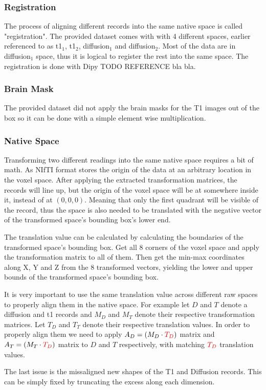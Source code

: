 \subsubsection{Registration}
The process of aligning different records into the same native space is called "registration". The provided dataset comes with with 4 different spaces, earlier referenced to as t1$_1$, t1$_2$, diffusion$_1$ and diffusion$_2$. Most of the data are in diffusion$_1$ space, thus it is logical to register the rest into the same space. The registration is done with Dipy TODO REFERENCE bla bla.

\subsubsection{Brain Mask}
The provided dataset did not apply the brain masks for the T1 images out of the box so it can be done with a simple element wise multiplication.

\subsubsection{Native Space}
Transforming two different readings into the same native space requires a bit of math. As \ac{NIfTI} format stores the origin of the data at an arbitrary location in the voxel space. After applying the extracted transformation matrices, the records will line up, but the origin of the voxel space will be at somewhere inside it, instead of at $(0,0,0)$. Meaning that only the first quadrant will be visible of the record, thus the space is also needed to be translated with the negative vector of the transformed space's bounding box's lower end.\par
The translation value can be calculated by calculating the boundaries of the transformed space's bounding box. Get all 8 corners of the voxel space and apply the transformation matrix to all of them. Then get the min-max coordinates along X, Y and Z from the 8 transformed vectors, yielding the lower and upper bounds of the transformed space's bounding box.\par
It is very important to use the same translation value across different raw spaces to properly align them in the native space. For example let $D$ and $T$ denote a diffusion and t1 records and $M_D$ and $M_T$ denote their respective transformation matrices. Let $T_D$ and $T_T$ denote their respective translation values. In order to properly align them we need to apply $A_D = (M_D \cdot {\color{red}T_D})$ matrix and $A_T = (M_T \cdot {\color{red}T_D})$ matrix to $D$ and $T$ respectively, with matching ${\color{red}T_D}$ translation values.\par
The last issue is the missaligned new shapes of the T1 and Diffusion records. This can be simply fixed by truncating the excess along each dimension.

